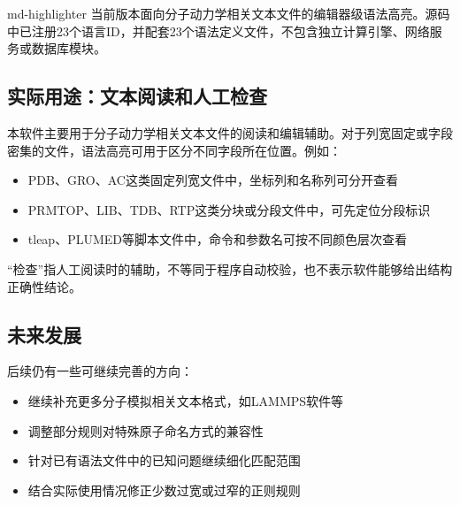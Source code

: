md-highlighter 当前版本面向分子动力学相关文本文件的编辑器级语法高亮。源码中已注册23个语言ID，并配套23个语法定义文件，不包含独立计算引擎、网络服务或数据库模块。

\subsection{实际用途：文本阅读和人工检查}

本软件主要用于分子动力学相关文本文件的阅读和编辑辅助。对于列宽固定或字段密集的文件，语法高亮可用于区分不同字段所在位置。例如：
\begin{itemize}
    \item PDB、GRO、AC这类固定列宽文件中，坐标列和名称列可分开查看
    \item PRMTOP、LIB、TDB、RTP这类分块或分段文件中，可先定位分段标识
    \item tleap、PLUMED等脚本文件中，命令和参数名可按不同颜色层次查看
\end{itemize}

“检查”指人工阅读时的辅助，不等同于程序自动校验，也不表示软件能够给出结构正确性结论。

\subsection{未来发展}

后续仍有一些可继续完善的方向：
\begin{itemize}
    \item 继续补充更多分子模拟相关文本格式，如LAMMPS软件等
    \item 调整部分规则对特殊原子命名方式的兼容性
    \item 针对已有语法文件中的已知问题继续细化匹配范围
    \item 结合实际使用情况修正少数过宽或过窄的正则规则
\end{itemize}
